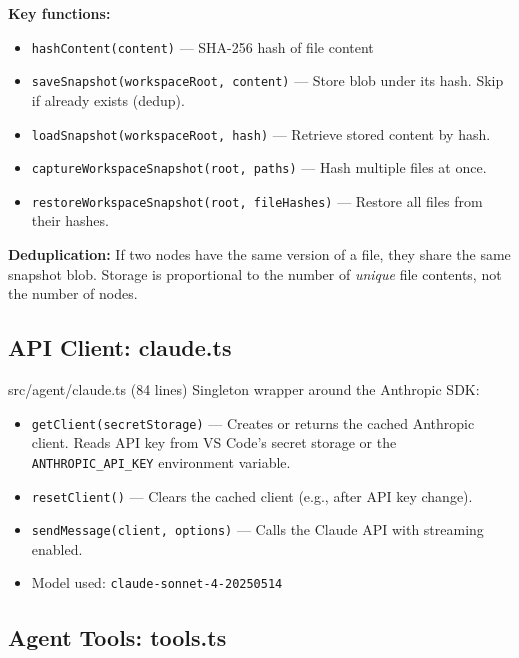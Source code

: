 \documentclass[12pt, a4paper]{article}
\begin{document}
\textbf{Key functions:}
\begin{itemize}
    \item \texttt{hashContent(content)} --- SHA-256 hash of file content
    \item \texttt{saveSnapshot(workspaceRoot, content)} --- Store blob under its hash. Skip if already exists (dedup).
    \item \texttt{loadSnapshot(workspaceRoot, hash)} --- Retrieve stored content by hash.
    \item \texttt{captureWorkspaceSnapshot(root, paths)} --- Hash multiple files at once.
    \item \texttt{restoreWorkspaceSnapshot(root, fileHashes)} --- Restore all files from their hashes.
\end{itemize}

\begin{keypoint}
\textbf{Deduplication:} If two nodes have the same version of a file, they share the same snapshot blob. Storage is proportional to the number of \textit{unique} file contents, not the number of nodes.
\end{keypoint}

\subsection{API Client: claude.ts}

\begin{filebox}{src/agent/claude.ts \quad (84 lines)}
Singleton wrapper around the Anthropic SDK:

\begin{itemize}
    \item \texttt{getClient(secretStorage)} --- Creates or returns the cached Anthropic client. Reads API key from VS Code's secret storage or the \texttt{ANTHROPIC\_API\_KEY} environment variable.
    \item \texttt{resetClient()} --- Clears the cached client (e.g., after API key change).
    \item \texttt{sendMessage(client, options)} --- Calls the Claude API with streaming enabled.
    \item Model used: \texttt{claude-sonnet-4-20250514}
\end{itemize}
\end{filebox}

\subsection{Agent Tools: tools.ts}
\end{document}
